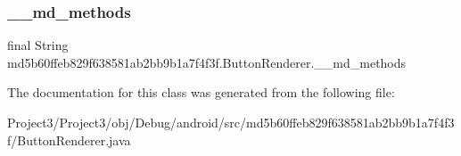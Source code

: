 \subsubsection{\texorpdfstring{\+\_\+\+\_\+md\+\_\+methods}{\_\_md\_methods}}
{\footnotesize\ttfamily final String md5b60ffeb829f638581ab2bb9b1a7f4f3f.\+Button\+Renderer.\+\_\+\+\_\+md\+\_\+methods\hspace{0.3cm}{\ttfamily [static]}}



The documentation for this class was generated from the following file\+:\begin{DoxyCompactItemize}
\item 
Project3/\+Project3/obj/\+Debug/android/src/md5b60ffeb829f638581ab2bb9b1a7f4f3f/Button\+Renderer.\+java\end{DoxyCompactItemize}
